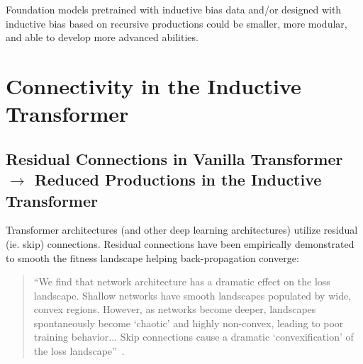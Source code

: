 \documentclass{article}
\begin{document}
Foundation models pretrained with inductive bias data and/or designed with inductive bias based on recursive productions could be smaller, more modular, and able to develop more advanced abilities.  




\newpage



\newpage
\appendix



\section{Connectivity in the Inductive Transformer}\label{appendix:connectivity}

\subsection{Residual Connections in Vanilla Transformer $\rightarrow$ Reduced Productions in the Inductive Transformer}\label{appendix:residual-connection}

Transformer architectures (and other deep learning architectures) utilize residual (ie. skip) connections.  Residual connections have been empirically demonstrated to smooth the fitness landscape helping back-propagation converge:

\begin{quote}
``We find that network architecture has a dramatic effect on the loss landscape. Shallow networks have smooth landscapes populated by wide, convex regions. However, as networks become deeper, landscapes spontaneously become `chaotic' and highly non-convex, leading to poor training behavior... Skip connections cause a dramatic `convexification' of the loss landscape''~\citep{DBLP:journals/corr/abs-1712-09913}.
\end{quote}
\end{document}
